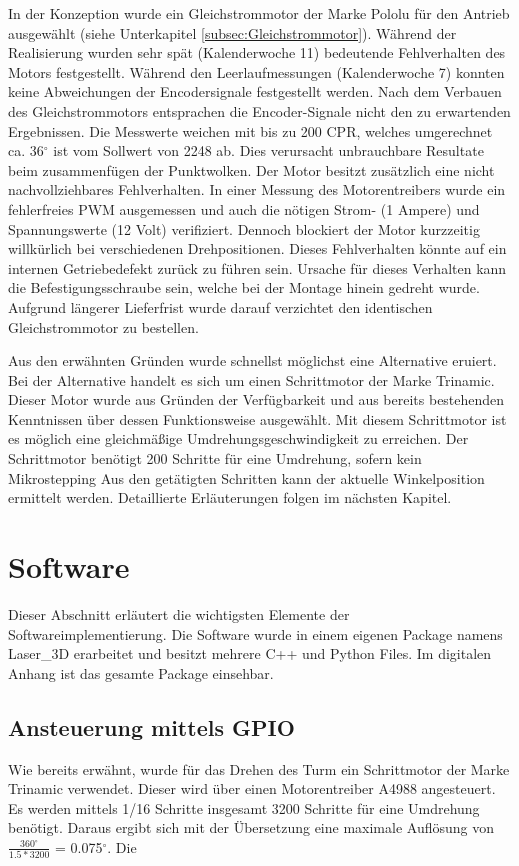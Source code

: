 In der Konzeption wurde ein Gleichstrommotor der Marke Pololu für den Antrieb ausgewählt (siehe Unterkapitel \ref{subsec:Gleichstrommotor}). Während der Realisierung wurden sehr spät (Kalenderwoche 11) bedeutende Fehlverhalten des Motors festgestellt. Während den Leerlaufmessungen (Kalenderwoche 7) konnten keine Abweichungen der Encodersignale festgestellt werden. Nach dem Verbauen des Gleichstrommotors entsprachen die Encoder-Signale nicht den zu erwartenden Ergebnissen. Die Messwerte weichen mit bis zu 200 \ac{CPR}, welches umgerechnet ca. 36$^\circ$ ist vom Sollwert von 2248 ab. Dies verursacht unbrauchbare Resultate beim zusammenfügen der Punktwolken. Der Motor besitzt zusätzlich eine nicht nachvollziehbares Fehlverhalten. In einer Messung des Motorentreibers wurde ein fehlerfreies \ac{PWM} ausgemessen und auch die nötigen Strom- (1 Ampere) und Spannungswerte (12 Volt) verifiziert. Dennoch blockiert der Motor kurzzeitig willkürlich bei verschiedenen Drehpositionen. Dieses Fehlverhalten könnte auf ein internen Getriebedefekt zurück zu führen sein. Ursache für dieses Verhalten kann die Befestigungsschraube sein, welche bei der Montage hinein gedreht wurde. Aufgrund längerer Lieferfrist wurde darauf verzichtet den identischen Gleichstrommotor zu bestellen. 

Aus den erwähnten Gründen wurde schnellst möglichst eine Alternative eruiert. Bei der Alternative handelt es sich um einen Schrittmotor der Marke Trinamic. Dieser Motor wurde aus Gründen der Verfügbarkeit und aus bereits bestehenden Kenntnissen über dessen Funktionsweise ausgewählt. Mit diesem Schrittmotor ist es möglich eine gleichmäßige Umdrehungsgeschwindigkeit zu erreichen. Der Schrittmotor benötigt 200 Schritte für eine Umdrehung, sofern kein \ac{Mikrostepping} Aus den getätigten Schritten kann der aktuelle Winkelposition ermittelt werden. Detaillierte Erläuterungen folgen im nächsten Kapitel.

\section{Software}
\label{sec:SoftwareReal}
Dieser Abschnitt erläutert die wichtigsten Elemente der Softwareimplementierung. Die Software wurde in einem eigenen Package namens Laser\_3D erarbeitet und besitzt mehrere C++ und Python Files. Im digitalen Anhang ist das gesamte Package einsehbar.

\subsection {Ansteuerung mittels GPIO}
\label{subsec:Ansteuerung}
Wie bereits erwähnt, wurde für das Drehen des Turm ein Schrittmotor der Marke Trinamic verwendet. Dieser wird über einen Motorentreiber A4988 angesteuert. Es werden mittels 1/16 Schritte insgesamt 3200 Schritte für eine Umdrehung benötigt. Daraus ergibt sich mit der Übersetzung eine maximale Auflösung von $\frac{360^\circ}{1.5 * 3200}$ = 0.075$^\circ$. Die 

